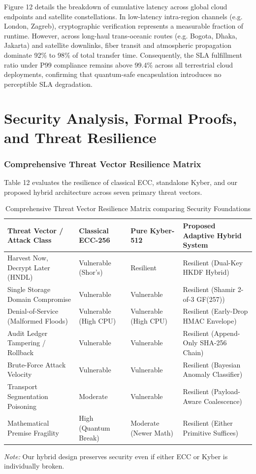 \documentclass[5p,times]{elsarticle}
\begin{document}
Figure 12 details the breakdown of cumulative latency across global cloud endpoints and satellite constellations. In low-latency intra-region channels (e.g. London, Zagreb), cryptographic verification represents a measurable fraction of runtime. However, across long-haul trans-oceanic routes (e.g. Bogota, Dhaka, Jakarta) and satellite downlinks, fiber transit and atmospheric propagation dominate 92\% to 98\% of total transfer time. Consequently, the SLA fulfillment ratio under P99 compliance remains above 99.4\% across all terrestrial cloud deployments, confirming that quantum-safe encapsulation introduces no perceptible SLA degradation.


\section{Security Analysis, Formal Proofs, and Threat Resilience}


\subsubsection{Comprehensive Threat Vector Resilience Matrix}

Table 12 evaluates the resilience of classical ECC, standalone Kyber, and our proposed hybrid architecture across seven primary threat vectors.

\begin{table}[!t]
  \centering
  \footnotesize
  \caption{Comprehensive Threat Vector Resilience Matrix comparing Security Foundations}
  \label{tab:12}
  \begin{tabularx}{\textwidth}{p{5.0cm}p{3.2cm}p{3.2cm}X}
    \toprule
    \textbf{Threat Vector / Attack Class} & \textbf{Classical ECC-256} & \textbf{Pure Kyber-512} & \textbf{Proposed Adaptive Hybrid System} \\
    \midrule
    Harvest Now, Decrypt Later (HNDL) & Vulnerable (Shor's) & Resilient & Resilient (Dual-Key HKDF Hybrid) \\
    Single Storage Domain Compromise & Vulnerable & Vulnerable & Resilient (Shamir 2-of-3 GF(257)) \\
    Denial-of-Service (Malformed Floods) & Vulnerable (High CPU) & Vulnerable (High CPU) & Resilient (Early-Drop HMAC Envelope) \\
    Audit Ledger Tampering / Rollback & Vulnerable & Vulnerable & Resilient (Append-Only SHA-256 Chain) \\
    Brute-Force Attack Velocity & Vulnerable & Vulnerable & Resilient (Bayesian Anomaly Classifier) \\
    Transport Segmentation Poisoning & Moderate & Vulnerable & Resilient (Payload-Aware Coalescence) \\
    Mathematical Premise Fragility & High (Quantum Break) & Moderate (Newer Math) & Resilient (Either Primitive Suffices) \\
    \bottomrule
  \end{tabularx}
  \vspace{2pt}
  \flushleft\scriptsize \textit{Note:} Our hybrid design preserves security even if either ECC or Kyber is individually broken.
\end{table}
\end{document}
